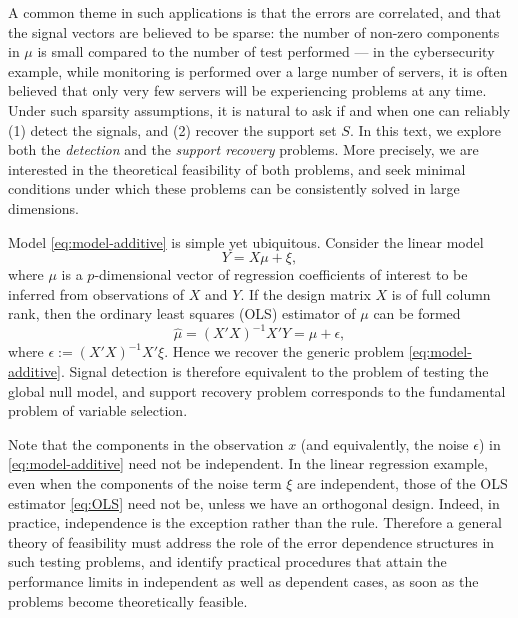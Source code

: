 A common theme in such applications is that the errors are correlated, and that the signal vectors are believed to be sparse: the number of non-zero components in $\mu$ is small compared to the number of test performed --- in the cybersecurity example, while monitoring is performed over a large number of servers, it is often believed that only very few servers will be experiencing problems at any time.
Under such sparsity assumptions, it is natural to ask if and when one can reliably {(1)} detect the signals, and {(2)} recover the support set $S$.
In this text, we explore both the \emph{detection} and the \emph{support recovery} problems.  More precisely, we are interested in the 
theoretical feasibility of both problems, and seek minimal conditions under which these problems can be consistently solved in large 
dimensions.


\medskip

Model \eqref{eq:model-additive} is simple yet ubiquitous.
Consider the linear model
\begin{equation*}
 Y = X\mu + \xi,
\end{equation*}
where $\mu$ is a $p$-dimensional vector of regression coefficients of interest to be inferred from observations of $X$ and $Y$.
If the design matrix $X$ is of full column rank, then the ordinary least squares (OLS) estimator of $\mu$ can be formed 
\begin{equation} \label{eq:OLS}
    \widehat{\mu} = \left(X'X\right)^{-1}X'Y = \mu + \epsilon,
\end{equation}
where $\epsilon := (X'X)^{-1}X'\xi$.
Hence we recover the generic problem \eqref{eq:model-additive}. 
Signal detection is therefore equivalent to the problem of testing the global null model, and support recovery problem corresponds to the fundamental problem of variable selection.

Note that the components in the observation $x$ (and equivalently, the noise $\epsilon$) in \eqref{eq:model-additive} need not be independent. 
In the linear regression example, even when the components of the noise term $\xi$ are independent, those of the OLS estimator \eqref{eq:OLS} need not be, unless we have an orthogonal design.
Indeed, in practice, independence is the exception rather than the rule.
Therefore a general theory of feasibility must address the role of the error dependence structures in such testing problems, and identify practical procedures that attain the performance limits in independent as well as dependent cases, as soon as the problems become theoretically feasible.


